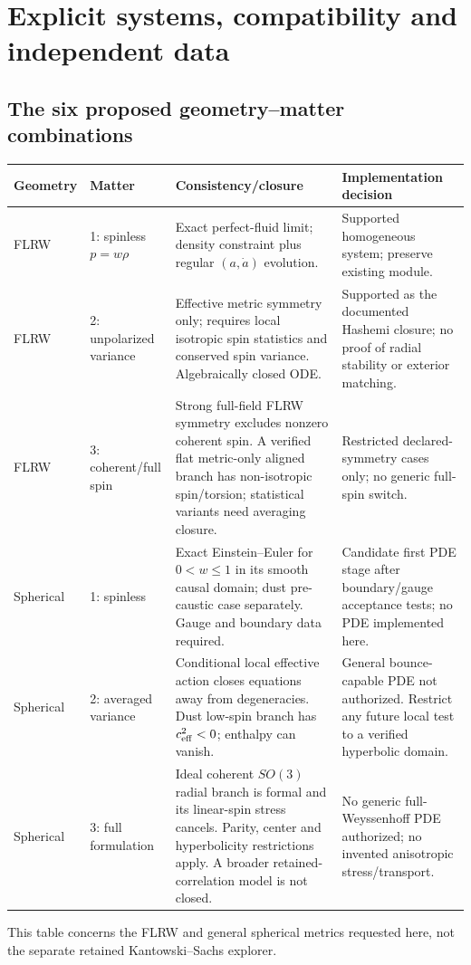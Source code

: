 \section{Explicit systems, compatibility and independent data}
\subsection{The six proposed geometry--matter combinations}
\begin{longtable}{p{}p{}p{}p{}}
\toprule Geometry & Matter & Consistency/closure & Implementation decision\\\midrule\endhead
FLRW & 1: spinless $p=w\rho$ & Exact perfect-fluid limit; density constraint plus regular $(a,\dot a)$ evolution. & Supported homogeneous system; preserve existing module.\\
FLRW & 2: unpolarized variance & Effective metric symmetry only; requires local isotropic spin statistics and conserved spin variance. Algebraically closed ODE. & Supported as the documented Hashemi closure; no proof of radial stability or exterior matching.\\
FLRW & 3: coherent/full spin & Strong full-field FLRW symmetry excludes nonzero coherent spin. A verified flat metric-only aligned branch has non-isotropic spin/torsion; statistical variants need averaging closure. & Restricted declared-symmetry cases only; no generic full-spin switch.\\
Spherical & 1: spinless & Exact Einstein--Euler for $0<w\leq1$ in its smooth causal domain; dust pre-caustic case separately. Gauge and boundary data required. & Candidate first PDE stage after boundary/gauge acceptance tests; no PDE implemented here.\\
Spherical & 2: averaged variance & Conditional local effective action closes equations away from degeneracies. Dust low-spin branch has $c_{\rm eff}^2<0$; enthalpy can vanish. & General bounce-capable PDE not authorized. Restrict any future local test to a verified hyperbolic domain.\\
Spherical & 3: full formulation & Ideal coherent $SO(3)$ radial branch is formal and its linear-spin stress cancels. Parity, center and hyperbolicity restrictions apply. A broader retained-correlation model is not closed. & No generic full-Weyssenhoff PDE authorized; no invented anisotropic stress/transport.\\\bottomrule
\end{longtable}
This table concerns the FLRW and general spherical metrics requested here, not the separate retained Kantowski--Sachs explorer.

